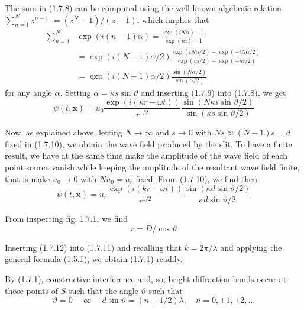 \documentclass{article}
\begin{document}
The sum in (1.7.8) can be computed using the well-known algebraic relation $\sum_{n=1}^{N} z^{n-1}$ $=\left(z^{N}-1\right) /(z-1)$, which implies that
$$
\begin{align*}
\sum_{n=1}^{N} & \exp (i(n-1) \alpha)=\frac{\exp (i N \alpha)-1}{\exp (i \alpha)-1}  \tag{1.7.9}\\
& =\exp (i(N-1) \alpha / 2) \frac{\exp (i N \alpha / 2)-\exp (-i N \alpha / 2)}{\exp (i \alpha / 2)-\exp (-i \alpha / 2)} \\
& =\exp (i(N-1) \alpha / 2) \frac{\sin (N \alpha / 2)}{\sin (\alpha / 2)}
\end{align*}
$$
for any angle $\alpha$. Setting $\alpha=\kappa s \sin \vartheta$ and inserting (1.7.9) into (1.7.8), we get
$$
\begin{equation*}
\psi(t, \boldsymbol{x})=u_{0} \frac{\exp (i(\kappa r-\omega t))}{r^{1 / 2}} \frac{\sin (N \kappa s \sin \vartheta / 2)}{\sin (\kappa s \sin \vartheta / 2)} \tag{1.7.10}
\end{equation*}
$$

Now, as explained above, letting $N \rightarrow \infty$ and $s \rightarrow 0$ with $N s \approx(N-1) s=d$ fixed in (1.7.10), we obtain the wave field produced by the slit. To have a finite result, we have at the same time make the amplitude of the wave field of each point source vanish while keeping the amplitude of the resultant wave field finite, that is make $u_{0} \rightarrow 0$ with $N u_{0}=u_{r}$ fixed. From (1.7.10), we find then
$$
\begin{equation*}
\psi(t, \boldsymbol{x})=u_{r} \frac{\exp (i(k r-\omega t))}{r^{1 / 2}} \frac{\sin (\kappa d \sin \vartheta / 2)}{\kappa d \sin \vartheta / 2} \tag{1.7.11}
\end{equation*}
$$

From inspecting fig. 1.7.1, we find
$$
\begin{equation*}
r=D / \cos \vartheta \tag{1.7.12}
\end{equation*}
$$

Inserting (1.7.12) into (1.7.11) and recalling that $k=2 \pi / \lambda$ and applying the general formula (1.5.1), we obtain (1.7.1) readily.

By (1.7.1), constructive interference and, so, bright diffraction bands occur at those points of $S$ such that the angle $\vartheta$ such that
$$
\begin{equation*}
\vartheta=0 \quad \text { or } \quad d \sin \vartheta=(n+1 / 2) \lambda, \quad n=0, \pm 1, \pm 2, \ldots \tag{1.7.13}
\end{equation*}
$$
\end{document}
